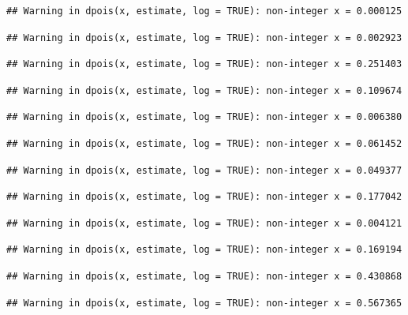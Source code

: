 \documentclass[]{article}
\begin{document}
\begin{verbatim}
## Warning in dpois(x, estimate, log = TRUE): non-integer x = 0.000125
\end{verbatim}

\begin{verbatim}
## Warning in dpois(x, estimate, log = TRUE): non-integer x = 0.002923
\end{verbatim}

\begin{verbatim}
## Warning in dpois(x, estimate, log = TRUE): non-integer x = 0.251403
\end{verbatim}

\begin{verbatim}
## Warning in dpois(x, estimate, log = TRUE): non-integer x = 0.109674
\end{verbatim}

\begin{verbatim}
## Warning in dpois(x, estimate, log = TRUE): non-integer x = 0.006380
\end{verbatim}

\begin{verbatim}
## Warning in dpois(x, estimate, log = TRUE): non-integer x = 0.061452
\end{verbatim}

\begin{verbatim}
## Warning in dpois(x, estimate, log = TRUE): non-integer x = 0.049377
\end{verbatim}

\begin{verbatim}
## Warning in dpois(x, estimate, log = TRUE): non-integer x = 0.177042
\end{verbatim}

\begin{verbatim}
## Warning in dpois(x, estimate, log = TRUE): non-integer x = 0.004121
\end{verbatim}

\begin{verbatim}
## Warning in dpois(x, estimate, log = TRUE): non-integer x = 0.169194
\end{verbatim}

\begin{verbatim}
## Warning in dpois(x, estimate, log = TRUE): non-integer x = 0.430868
\end{verbatim}

\begin{verbatim}
## Warning in dpois(x, estimate, log = TRUE): non-integer x = 0.567365
\end{verbatim}
\end{document}
